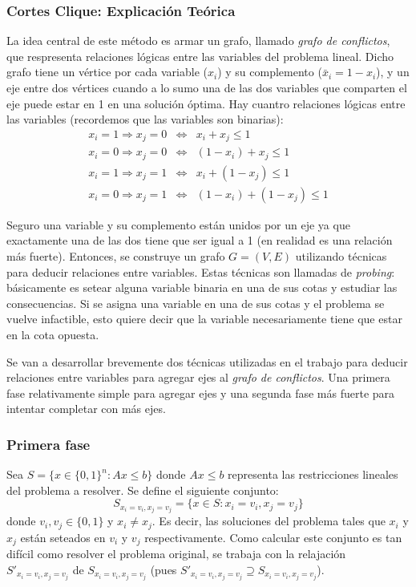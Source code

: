 \subsubsection{Cortes Clique: Explicación Teórica}

La idea central de este método es armar un grafo, llamado \textit{grafo de conflictos}, que respresenta relaciones l\'ogicas entre las variables del problema lineal. Dicho grafo tiene un v\'ertice por cada variable ($x_i$) y su complemento ($\bar{x}_i = 1 - x_i$), y un eje entre dos v\'ertices cuando a lo sumo una de las dos variables que comparten el eje puede estar en 1 en una soluci\'on \'optima. Hay cuantro relaciones l\'ogicas entre las variables (recordemos que las variables son binarias):
\begin{eqnarray*}
x_i = 1 \Rightarrow x_j = 0 & \Longleftrightarrow & x_i + x_j \leq 1 \\
x_i = 0 \Rightarrow x_j = 0 & \Longleftrightarrow & (1 - x_i) + x_j \leq 1 \\
x_i = 1 \Rightarrow x_j = 1 & \Longleftrightarrow & x_i + (1 - x_j) \leq 1 \\
x_i = 0 \Rightarrow x_j = 1 & \Longleftrightarrow & (1 - x_i) + (1 - x_j) \leq 1 
\end{eqnarray*}

Seguro una variable y su complemento est\'an unidos por un eje ya que exactamente una de las dos tiene que ser igual a 1 (en realidad es una relaci\'on m\'as fuerte). Entonces, se construye un grafo $G = (V,E)$ utilizando t\'ecnicas para deducir relaciones entre variables. Estas t\'ecnicas son llamadas de \textit{probing}: b\'asicamente es setear alguna variable binaria en una de sus cotas y estudiar las consecuencias. Si se asigna una variable en una de sus cotas y el problema se vuelve infactible, esto quiere decir que la variable necesariamente tiene que estar en la cota opuesta.

Se van a desarrollar brevemente dos t\'ecnicas utilizadas en el trabajo para deducir relaciones entre variables para agregar ejes al \textit{grafo de conflictos}. Una primera fase relativamente simple para agregar ejes y una segunda fase m\'as fuerte para intentar completar con m\'as ejes.

\subsubsection*{Primera fase}

Sea $S = \{x\in \{0,1\}^n : Ax \leq b\}$ donde $Ax \leq b$ representa las restricciones lineales del problema a resolver. Se define el siguiente conjunto:
$$S_{x_i=v_i,x_j=v_j} = \{x\in S : x_i = v_i, x_j = v_j\}$$ 
donde $v_i,v_j\in \{0,1\}$ y $x_i \neq x_j$. Es decir, las soluciones del problema tales que $x_i$ y $x_j$ est\'an seteados en $v_i$ y $v_j$ respectivamente. Como calcular este conjunto es tan dif\'icil como resolver el problema original, se trabaja con la relajaci\'on $S'_{x_i=v_i,x_j=v_j}$ de $S_{x_i=v_i,x_j=v_j}$ (pues $S'_{x_i=v_i,x_j=v_j} \supseteq S_{x_i=v_i,x_j=v_j}$). \\

